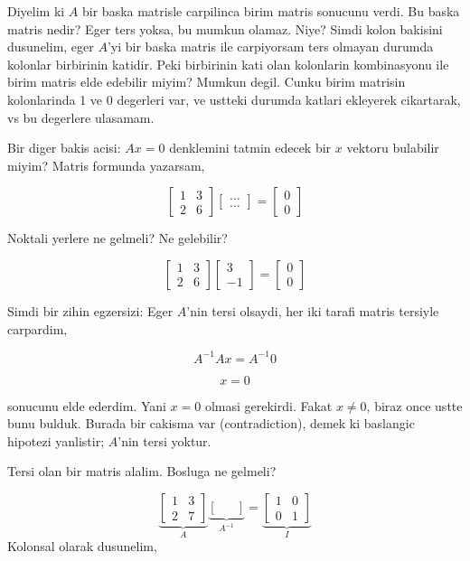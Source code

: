 \documentclass[12pt,fleqn]{article}\usepackage{../common}
\begin{document}
Diyelim ki $A$ bir baska matrisle carpilinca birim matris sonucunu
verdi. Bu baska matris nedir? Eger ters yoksa, bu mumkun olamaz. Niye?
Simdi kolon bakisini dusunelim, eger $A$'yi bir baska matris ile
carpiyorsam ters olmayan durumda kolonlar birbirinin katidir. Peki
birbirinin kati olan kolonlarin kombinasyonu ile birim matris elde edebilir
miyim? Mumkun degil. Cunku birim matrisin kolonlarinda 1 ve 0 degerleri
var, ve ustteki durumda katlari ekleyerek cikartarak, vs bu degerlere
ulasamam. 

Bir diger bakis acisi: $Ax = 0$ denklemini tatmin edecek bir $x$ vektoru
bulabilir miyim? Matris formunda yazarsam, 

$$ 
\left[\begin{array}{rr}
1 & 3 \\ 2 & 6
\end{array}\right]
\left[\begin{array}{r}
\dots \\ \dots
\end{array}\right]
=
\left[\begin{array}{r}
0 \\ 0
\end{array}\right]
 $$

Noktali yerlere ne gelmeli? Ne gelebilir? 

$$ 
\left[\begin{array}{rr}
1 & 3 \\ 2 & 6
\end{array}\right]
\left[\begin{array}{r}
3 \\ -1
\end{array}\right]
=
\left[\begin{array}{r}
0 \\ 0
\end{array}\right]
 $$
 
Simdi bir zihin egzersizi: Eger $A$'nin tersi olsaydi, her iki tarafi
matris tersiyle carpardim,

$$A^{-1}Ax = A^{-1} 0$$

$$x = 0$$

sonucunu elde ederdim. Yani $x=0$ olmasi gerekirdi. Fakat $x \ne 0$, biraz
once ustte bunu bulduk. Burada bir cakisma var (contradiction), demek ki
baslangic hipotezi yanlistir; $A$'nin tersi yoktur. 

Tersi olan bir matris alalim. Bosluga ne gelmeli?

$$ 
\underbrace{
\left[\begin{array}{rrr}
1 & 3 \\
2 & 7
\end{array}\right]
}_{A}
\underbrace{
\left[\begin{array}{rrr}
 &  \\
 & 
\end{array}\right]
}_{A^{-1}}
=
\underbrace{
\left[\begin{array}{rrr}
1 & 0 \\
0 & 1
\end{array}\right]
}_{I}
 $$
Kolonsal olarak dusunelim, 
\end{document}
